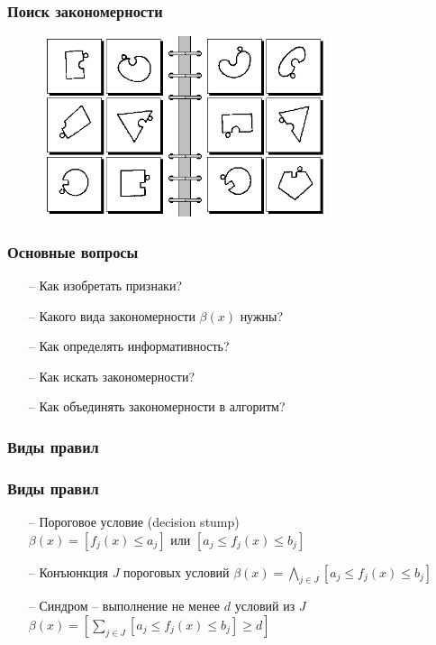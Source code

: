 \documentclass[12pt]{beamer}
\begin{document}
\begin{frame}\frametitle{Поиск закономерности}
\begin{figure}[htbp]
  \includegraphics[height=150pt, keepaspectratio = true]{images/bongard55}   
\end{figure}
\end{frame}

\begin{frame}\frametitle{Основные вопросы}
	\begin{itemize}
		\item[--] Как изобретать признаки? 
		\item[--] Какого вида закономерности $\beta(x)$ нужны?
		\item[--] Как определять информативность? 
		\item[--] Как искать закономерности?
		\item[--] Как объединять закономерности в алгоритм?
	\end{itemize}
\end{frame}

\begin{frame}\frametitle{Виды правил}
\end{frame}

\begin{frame}\frametitle{Виды правил}
\begin{itemize}
\item[--] Пороговое условие (decision stump)\\
$\beta(x) = \left[f_j(x) \leq a_j \right]$ или  $\left[a_j \leq f_j(x) \leq b_j \right]$
\item[--] Конъюнкция $J$ пороговых условий
$\beta(x) = \bigwedge\limits_{j \in J} \left[a_j \leq f_j(x) \leq b_j \right]$
\item[--] Синдром -- выполнение не менее $d$ условий из $J$
$\beta(x) = \left[\sum\limits_{j \in J} \left[a_j \leq f_j(x) \leq b_j \right] \geq d \right]$
\end{itemize}
\end{frame}
\end{document}
